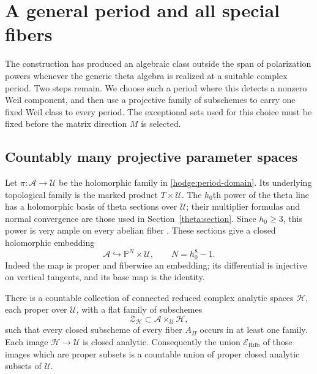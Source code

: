 \section{A general period and all special fibers}
\label{spread:section}

The construction has produced an algebraic class outside the span of
polarization powers whenever the generic theta algebra is realized at a
suitable complex period.  Two steps remain.  We choose such a period
where this detects a nonzero Weil component, and then use a projective
family of subschemes to carry one fixed Weil class to every period.
The exceptional sets used for this choice must be fixed before the
matrix direction $M$ is selected.

\subsection{Countably many projective parameter spaces}

Let $\pi:\mathscr A\to\mathcal U$ be the holomorphic family in
\eqref{hodge:period-domain}.  Its underlying topological family is the
marked product $T\times\mathcal U$.  The $h_0$th power of the theta
line has a holomorphic basis of theta sections over $\mathcal U$;
their multiplier formulas and normal convergence are those used in
Section~\ref{theta:section}.  Since $h_0\ge3$, this power is very ample
on every abelian fiber \cite{abelian-ampleness}.  These sections give a
closed holomorphic embedding
\begin{equation}
 \mathscr A\hookrightarrow\mathbb P^N\times\mathcal U,
 \qquad N=h_0^8-1.
 \label{spread:relative-embedding}
\end{equation}
Indeed the map is proper and fiberwise an embedding; its differential
is injective on vertical tangents, and its base map is the identity.

\begin{lemma}
\label{spread:hilbert-loci}
There is a countable collection of connected reduced complex analytic
spaces $\mathcal H$, each proper over $\mathcal U$, with a flat family
of subschemes
\[
 \mathscr Z_{\mathcal H}\subset
       \mathscr A\times_{\mathcal U}\mathcal H,
\]
such that every closed subscheme of every fiber $A_\Pi$ occurs in at
least one family.  Each image $\mathcal H\to\mathcal U$ is closed
analytic.  Consequently the union $\mathcal E_{\mathrm{Hilb}}$ of
those images which are proper subsets is a countable union of proper
closed analytic subsets of $\mathcal U$.
\end{lemma}

